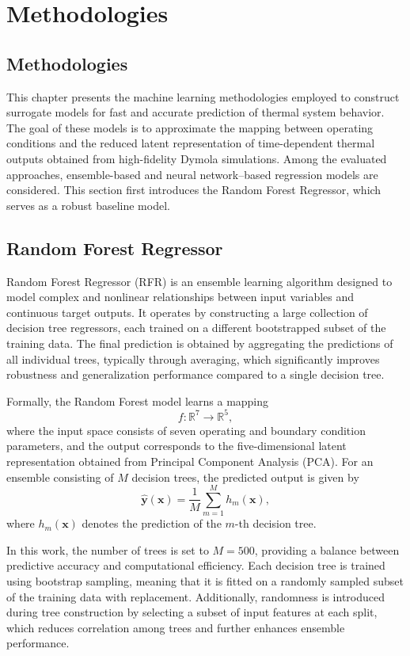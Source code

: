 \chapter{Methodologies}
\section{Methodologies}

This chapter presents the machine learning methodologies employed to construct surrogate models for fast and accurate prediction of thermal system behavior. The goal of these models is to approximate the mapping between operating conditions and the reduced latent representation of time-dependent thermal outputs obtained from high-fidelity Dymola simulations. Among the evaluated approaches, ensemble-based and neural network–based regression models are considered. This section first introduces the Random Forest Regressor, which serves as a robust baseline model.

\section{Random Forest Regressor}

Random Forest Regressor (RFR) is an ensemble learning algorithm designed to model complex and nonlinear relationships between input variables and continuous target outputs. It operates by constructing a large collection of decision tree regressors, each trained on a different bootstrapped subset of the training data. The final prediction is obtained by aggregating the predictions of all individual trees, typically through averaging, which significantly improves robustness and generalization performance compared to a single decision tree.

Formally, the Random Forest model learns a mapping
\[
f: \mathbb{R}^{7} \rightarrow \mathbb{R}^{5},
\]
where the input space consists of seven operating and boundary condition parameters, and the output corresponds to the five-dimensional latent representation obtained from Principal Component Analysis (PCA). For an ensemble consisting of \( M \) decision trees, the predicted output is given by
\[
\hat{\mathbf{y}}(\mathbf{x}) = \frac{1}{M} \sum_{m=1}^{M} h_m(\mathbf{x}),
\]
where \( h_m(\mathbf{x}) \) denotes the prediction of the \( m \)-th decision tree.

In this work, the number of trees is set to \( M = 500 \), providing a balance between predictive accuracy and computational efficiency. Each decision tree is trained using bootstrap sampling, meaning that it is fitted on a randomly sampled subset of the training data with replacement. Additionally, randomness is introduced during tree construction by selecting a subset of input features at each split, which reduces correlation among trees and further enhances ensemble performance.

